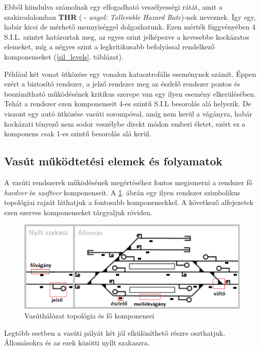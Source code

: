 \documentclass[a4paper,12pt]{article}
\begin{document}
Ebből kiindulva számolnak egy elfogadható veszélyességi rátát, amit a szakirodalomban \textbf{THR} ( -  \textit{angol: Tollerable Hazard Rate})-nek neveznek.
Így egy, habár kicsi de mérhető mennyiséggel dolgozhatunk. 
Ezen mérték függvényében 4 S.I.L. szintet határoztak meg, az egyes szint jelképezve a kevesebbe kockázatos elemeket, míg a négyes szint a legkritikusabb befolyással rendelkező komponenseket (\ref{sil_levels}. táblázat).

Például két vonat ütközése egy vonalon katasztrofális eseménynek számít.
Éppen ezért a biztosító rendszer, a jelző rendszer meg az észlelő rendszer pontos és beszámítható működésének kritikus szerepe van egy ilyen esemény elkerülésében. 
Tehát a rendszer ezen komponenseit 4-es szintű S.I.L besorolás alá helyezik. 
De viszont egy autó ütközése vasúti sorompóval, amíg nem kerül a vágányra, habár kockázati tényező nem sodor veszélybe direkt módon emberi életet, ezért ez a komponens csak 1-es szintű besorolás alá kerül.

\subsection{Vasút működtetési elemek és folyamatok}

A vasúti rendszerek működésének megértéséhez fontos megismerni a rendszer fő \textit{hardver} és \textit{szoftver} komponenseit. 
A \ref{fig:rail_topology_eg}. ábrán egy ilyen rendszer szimbolikus topológiai rajzát láthatjuk a fontosabb komponensekkel. 
A következő alfejezetek ezen szerves komponenseket tárgyaljuk röviden.

\begin{figure}[htp]
	\centering
    \includegraphics[width=\linewidth]{images/rail_topology_eg.png}
    \caption[Vasúthálózat topológia]{Vasúthálózat topológia és fő komponensei}
    \label{fig:rail_topology_eg}
\end{figure}
Legtöbb esetben a vasúti pályát két jól elkülöníthető  részre oszthatjuk.
Állomásokra és az ezek közötti nyílt szakaszra.
\end{document}
